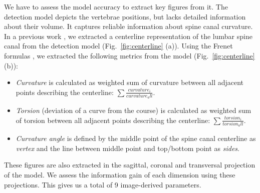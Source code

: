 \documentclass[a4paper,twoside]{style/article}
\newcommand{\com}[1]{\textcolor{orange}{\uline{#1}}}
\begin{document}
We have to assess the model accuracy to extract key figures from it.
The detection model depicts the vertebrae positions, but lacks detailed information about their volume.
It captures reliable information about spine canal curvature.
In a previous work \cite{KlemmVMV13, KlemmVIS14}, we extracted a centerline representation of the lumbar spine canal from the detection model (Fig.~\ref{fig:centerline} (a)).
Using the Frenet formulas \cite{Frenet}, we extracted the following metrics from the model (Fig.~\ref{fig:centerline} (b)):
\begin{itemize}
	\item \emph{Curvature} is calculated as weighted sum of curvature between all adjacent points describing the centerline: $\sum \frac{curvature_i}{curvature_all}$.
	\item \emph{Torsion} (deviation of a curve from the course) is calculated as weighted sum of torsion between all adjacent points describing the centerline: $\sum \frac{torsion_i}{torsion_all}$.
	\item \emph{Curvature angle} is defined by the middle point of the spine canal centerline as \emph{vertex} and the line between middle point and top/bottom point as \emph{sides}.
\end{itemize}
These figures are also extracted in the sagittal, coronal and transversal projection of the model.
We assess the information gain of each dimension using these projections.
This gives us a total of 9 image-derived parameters.


\end{document}
